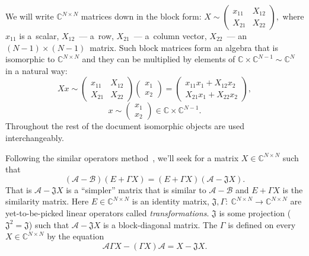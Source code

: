 We will write \( \mathbb{C}^{N\times N} \) matrices down in the block form:
\( X{\sim}
    \begin{pmatrix}
    x_{11} & X_{12} \\
    X_{21} & X_{22}
    \end{pmatrix}, \)
    where \( x_{11} \) is a~scalar,
    \( X_{12} \)~--- a~row, \( X_{21} \)~--- a~column vector,
    \( X_{22} \)~--- an \( {(N{-}1){\times}(N{-}1)} \)~matrix.
Such block matrices form an algebra that is isomorphic to \( \mathbb{C}^{N\times N} \)
and they can be multiplied by elements of \( \mathbb{C}\times\mathbb{C}^{N-1}\sim\mathbb{C}^N \)
in a natural way:
\[
    X x \sim
    \begin{pmatrix}
    x_{11} & X_{12} \\
    X_{21} & X_{22}
    \end{pmatrix}
    \begin{pmatrix} x_1 \\ x_2 \end{pmatrix}
  = \begin{pmatrix}
      x_{11} x_1 + X_{12} x_2 \\
      X_{21} x_1 + X_{22} x_2
      \end{pmatrix},
    \]
\[
      x \sim
      \begin{pmatrix} x_1 \\ x_2 \end{pmatrix}
          \in \mathbb{C}\times\mathbb{C}^{N-1}.
    \]
Throughout the rest of the document isomorphic objects
    are used interchangeably.

Following the similar operators method~\cite{baskakov-harmonic,baskakov1983},
    we'll seek for a matrix \( X{\in}\mathbb{C}^{N{\times}N} \) such that
\begin{equation}\label{kozlukovsv:eq:similarity}
    (\mathcal{A-B})(E+\Gamma X) =
    (E+\Gamma X)(\mathcal{A} - \mathfrak{J} X).
\end{equation}
That is \( \mathcal{A}{-}\mathfrak{J} X \) is a ``simpler'' matrix
    that is similar to \( \mathcal{A}{-}\mathcal{B} \)
    and \( E{+}\Gamma X \) is the similarity matrix.
Here \( E\in{\mathbb{C}^{N{\times}N}} \) is an identity matrix,
    \( \mathfrak{J},\Gamma{:}\ \mathbb{C}^{N{\times}N}{\to}\mathbb{C}^{N{\times}N} \)
    are yet-to-be-picked linear operators called \emph{transformations}.
\( \mathfrak{J} \) is some projection (\(\mathfrak{J}^2=\mathfrak{J}\))
    such that \( \mathcal{A} - \mathfrak{J}X \) is a block-diagonal matrix.
The \( \Gamma \) is defined on every
    \( X\in {\mathbb{C}^{N{\times}N}} \)
    by the equation
\begin{equation}\label{eq:kozlukovsv:gamma}
    \mathcal{A}\Gamma X - (\Gamma X) \mathcal{A} = X - \mathfrak{J}X.
\end{equation}

